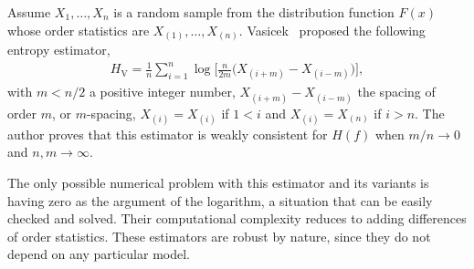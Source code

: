 \documentclass[journal]{IEEEtran}
\begin{document}
Assume $X_1,\dots,X_n$ is a random sample from the distribution function $F(x)$ whose order statistics are $X_{(1)}, \ldots, X_{(n)}$. 
Vasicek~\cite{Vasicek76} proposed the following entropy estimator,
\begin{align}
	\label{HV}
	H_{\text{V}}=\frac{1}{n} \sum_{i=1}^{n} \log \Big[\frac{n}{2 m}\big(X_{(i+m)}-X_{(i-m)}\big)\Big], 
\end{align}
with $m<n/2$ a positive integer number, $X_{(i+m)}-X_{(i-m)}$ the spacing of order $m$, or $m$-spacing, $X_{(i)}=X_{(i)}$ if $1<i$ and $X_{(i)}=X_{(n)}$ if $i>n$.
The author proves that this estimator is weakly consistent for $H(f)$ when $m/n \to 0$ and $n,m \to \infty$.

The only possible numerical problem with this estimator and its variants is having zero as the argument of the logarithm, a situation that can be easily checked and solved.
Their computational complexity reduces to adding differences of order statistics.
These estimators are robust by nature, since they do not depend on any particular model.
\end{document}
